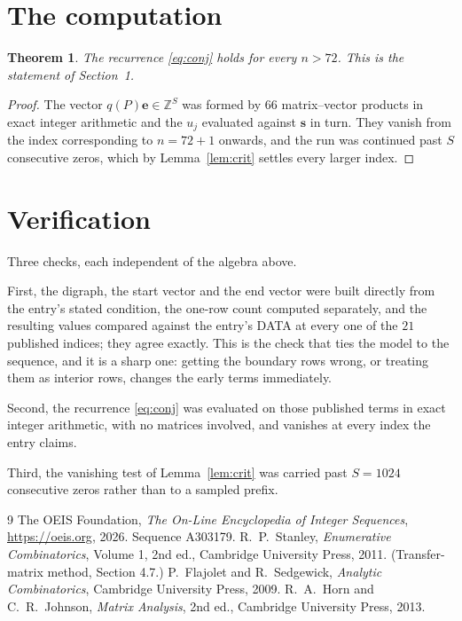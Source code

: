 \documentclass[11pt,a4paper]{article}
\theoremstyle{plain}
\newtheorem{theorem}{Theorem}
\theoremstyle{definition}
\begin{document}
\section{The computation}

\begin{theorem}
The recurrence \eqref{eq:conj} holds for every $n>72$. This is the statement of
Section~1.
\end{theorem}

\begin{proof}
The vector $q(P)\mathbf{e}\in\mathbb{Z}^{S}$ was formed by $66$ matrix--vector
products in exact integer arithmetic and the $u_j$ evaluated against $\mathbf{s}$ in turn.
They vanish from the index corresponding to $n=72+1$ onwards, and the run was continued
past $S$ consecutive zeros, which by Lemma~\ref{lem:crit} settles every larger index.
\end{proof}

\section{Verification}

Three checks, each independent of the algebra above.

First, the digraph, the start vector and the end vector were built directly from the
entry's stated condition, the one-row count computed separately, and the resulting values
compared against the entry's DATA at every one of the $21$ published indices; they
agree exactly. This is the check that ties the model to the sequence, and it is a sharp one:
getting the boundary rows wrong, or treating them as interior rows, changes the early terms
immediately.

Second, the recurrence \eqref{eq:conj} was evaluated on those published terms in exact
integer arithmetic, with no matrices involved, and vanishes at every index the entry claims.

Third, the vanishing test of Lemma~\ref{lem:crit} was carried past $S=1024$ consecutive
zeros rather than to a sampled prefix.

\begin{thebibliography}{9}
 The OEIS Foundation, \emph{The On-Line Encyclopedia of Integer
Sequences}, \url{https://oeis.org}, 2026. Sequence A303179.
 R.~P.~Stanley, \emph{Enumerative Combinatorics}, Volume 1, 2nd ed.,
Cambridge University Press, 2011. (Transfer-matrix method, Section 4.7.)
 P.~Flajolet and R.~Sedgewick, \emph{Analytic Combinatorics}, Cambridge
University Press, 2009.
 R.~A.~Horn and C.~R.~Johnson, \emph{Matrix Analysis}, 2nd ed., Cambridge
University Press, 2013.
\end{thebibliography}
\end{document}
